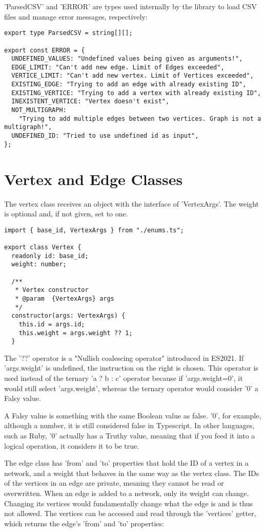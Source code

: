 'ParsedCSV' and 'ERROR' are types used internally by the library to load CSV files and manage error messages, respectively:

\begin{verbatim}
export type ParsedCSV = string[][];

export const ERROR = {
  UNDEFINED_VALUES: "Undefined values being given as arguments!",
  EDGE_LIMIT: "Can't add new edge. Limit of Edges exceeded",
  VERTICE_LIMIT: "Can't add new vertex. Limit of Vertices exceeded",
  EXISTING_EDGE: "Trying to add an edge with already existing ID",
  EXISTING_VERTICE: "Trying to add a vertex with already existing ID",
  INEXISTENT_VERTICE: "Vertex doesn't exist",
  NOT_MULTIGRAPH:
    "Trying to add multiple edges between two vertices. Graph is not a multigraph!",
  UNDEFINED_ID: "Tried to use undefined id as input",
};
\end{verbatim}

\section{Vertex and Edge Classes}
The vertex class receives an object with the interface of 'VertexArgs'. The weight is optional and, if not given, set to one.

\begin{verbatim}
import { base_id, VertexArgs } from "./enums.ts";

export class Vertex {
  readonly id: base_id;
  weight: number;

  /**
   * Vertex constructor
   * @param  {VertexArgs} args
   */
  constructor(args: VertexArgs) {
    this.id = args.id;
    this.weight = args.weight ?? 1;
  }
\end{verbatim}

The '??' operator is a "Nullish coalescing operator" introduced in ES2021. If 'args.weight' is undefined, the instruction on the right is chosen. This operator is used instead of the ternary 'a ? b : c' operator because if 'args.weight=0', it would still select 'args.weight', whereas the ternary operator would consider '0' a Falsy value.

A Falsy value is something with the same Boolean value as false. '0', for example, although a number, it is still considered false in Typescript. In other languages, such as Ruby, '0' actually has a Truthy value, meaning that if you feed it into a logical operation, it considers it to be true.

The edge class has 'from' and 'to' properties that hold the ID of a vertex in a network, and a weight that behaves in the same way as the vertex class. The IDs of the vertices in an edge are private, meaning they cannot be read or overwritten.
When an edge is added to a network, only its weight can change. Changing its vertices would fundamentally change what the edge is and is thus not allowed. The vertices can be accessed and read through the 'vertices' getter, which returns the edge's 'from' and 'to' properties:

